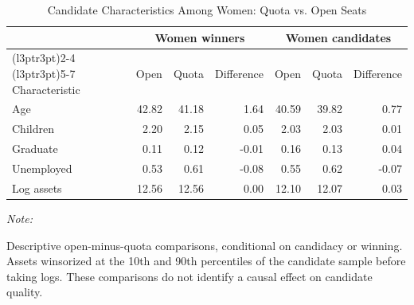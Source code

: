 \begin{table}
\centering
\caption{\label{tab:candidate_women}Candidate Characteristics Among Women: Quota vs. Open Seats}
\centering
\fontsize{8}{10}\selectfont
\begin{threeparttable}
\begin{tabular}[t]{lrrrrrr}
\toprule
\multicolumn{1}{c}{ } & \multicolumn{3}{c}{Women winners} & \multicolumn{3}{c}{Women candidates} \\
\cmidrule(l{3pt}r{3pt}){2-4} \cmidrule(l{3pt}r{3pt}){5-7}
Characteristic & Open & Quota & Difference & Open & Quota & Difference\\
\midrule
Age & 42.82 & 41.18 & 1.64 & 40.59 & 39.82 & 0.77\\
Children & 2.20 & 2.15 & 0.05 & 2.03 & 2.03 & 0.01\\
Graduate & 0.11 & 0.12 & -0.01 & 0.16 & 0.13 & 0.04\\
Unemployed & 0.53 & 0.61 & -0.08 & 0.55 & 0.62 & -0.07\\
Log assets & 12.56 & 12.56 & 0.00 & 12.10 & 12.07 & 0.03\\
\bottomrule
\end{tabular}
\begin{tablenotes}
\item \textit{Note: } 
\item Descriptive open-minus-quota comparisons, conditional on candidacy or winning. Assets winsorized at the 10th and 90th percentiles of the candidate sample before taking logs. These comparisons do not identify a causal effect on candidate quality.
\end{tablenotes}
\end{threeparttable}
\end{table}
